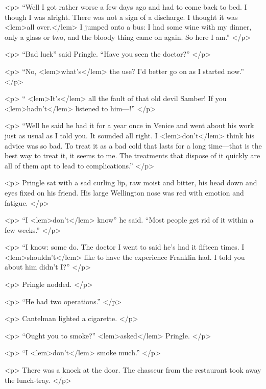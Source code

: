 {{				<p>
				“Well I got rather worse a few days ago and had to come back to bed. I though I was 
				alright. There was not a sign of a discharge. I thought it was 
<lem>all over.</lem> 
					{}
				I jumped onto 
				a bus: I had some wine with my dinner, only a glass or two, and the bloody thing 
				came on again. So here I am.” 
 				</p> 

				<p>
				“Bad luck” said Pringle. “Have you seen the doctor?” 
 				</p> 

				<p>
				“No, 
<lem>what's</lem>{} the use? I'd better go on as I started now.” 
 				</p> 

				<p>
				“
<lem>It's</lem>{} all the fault of that old devil Samber! If you 
<lem>hadn't</lem>
					{} 
				listened to him---!” 
 				</p> 

				<p>
				“Well he said he had it for a year once in Venice and went about his work just as 
				usual as I told you. It sounded all right. I 
<lem>don't</lem>
					{} 
				think his advice was so bad. To 
				treat it as a bad cold that lasts for a long time---that is the best way to treat 
				it, it seems to me. The treatments that dispose of it quickly are all of them apt to 
				lead to complications.” 
 				</p> 

				<p>
				Pringle sat with a sad curling lip, raw moist and bitter, his head down and eyes 
				fixed on his friend. His large Wellington nose was red with emotion and fatigue. 
 				</p> 

				<p>
				“I 
<lem>don't</lem>
					{} 
				know” he said. “Most people get rid of it within a few weeks.” 
 				</p> 

				<p>
				“I know: some do. The doctor I went to said he's had it fifteen times. I 
<lem>shouldn't</lem>
					{} 
				like 
				to have the experience Franklin had. I told you about him didn't I?” 
 				</p> 

				<p>
				Pringle nodded. 
 				</p> 

				<p>
				“He had two operations.” 
 				</p> 

				<p>
				Cantelman lighted a cigarette. 
 				</p> 

				<p>
				“Ought you to smoke?” 
<lem>asked</lem>{} Pringle. 
				</p> 

				<p>
“I 
<lem>don't</lem>
					{} 
				smoke much.” 
				</p> 

				<p>
				There was a knock at the door. The chasseur from the restaurant took away the lunch-tray. 
 				</p> 

}}

